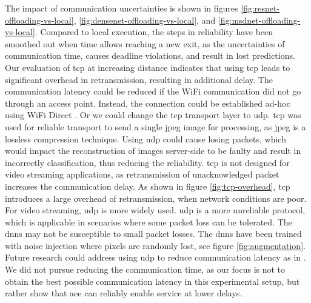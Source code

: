 The impact of communication uncertainties is shown in figures \ref{fig:resnet-offloading-vs-local}, \ref{fig:densenet-offloading-vs-local}, and \ref{fig:msdnet-offloading-vs-local}. Compared to local execution, the steps in reliability have been smoothed out when time allows reaching a new exit, as the uncertainties of communication time, causes deadline violations, and result in lost predictions. Our evaluation of \gls{tcp} at increasing distance indicates that using \gls{tcp} leads to significant overhead in retransmission, resulting in additional delay. The communication latency could be reduced if the WiFi communication did not go through an access point. Instead, the connection could be established ad-hoc using WiFi Direct \cite{noauthor_wi-fi_nodate}. Or we could change the \gls{tcp} transport layer to \gls{udp}. \gls{tcp} was used for reliable transport to send a single jpeg image for processing, as jpeg is a lossless compression technique. Using \gls{udp} could cause losing packets, which would impact the reconstruction of images server-side to be faulty and result in incorrectly classification, thus reducing the reliability. \gls{tcp} is not designed for video streaming applications, as retransmission of unacknowledged packet increases the communication delay. As shown in figure \ref{fig:tcp-overhead}, \gls{tcp} introduces a large overhead of retransmission, when network conditions are poor. For video streaming, \gls{udp} is more widely used. \gls{udp} is a more unreliable protocol, which is applicable in scenarios where some packet loss can be tolerated. The \gls{dnn}s may not be susceptible to small packet losses. The \gls{dnn}s have been trained with noise injection where pixels are randomly lost, see figure \ref{fig:augmentation}. Future research could address using \gls{udp} to reduce communication latency as in \cite{liu_maximizing_2019}. We did not pursue reducing the communication time, as our focus is not to obtain the best possible communication latency in this experimental setup, but rather show that \gls{aee} can reliably enable service at lower delays. 

